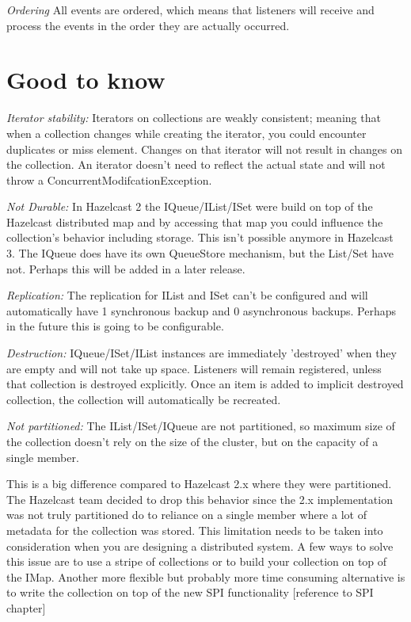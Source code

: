 \emph{Ordering} All events are ordered, which means that listeners will receive and process the events in the order they are actually occurred. 

\section{Good to know}

\emph{Iterator stability:} Iterators on collections are weakly consistent; meaning that when a collection changes while creating the iterator, you could encounter duplicates or miss element. Changes on that iterator will not result in changes on the collection. An iterator doesn't need to reflect the actual state and will not throw a ConcurrentModifcationException. 

\emph{Not Durable:} In Hazelcast 2 the IQueue/IList/ISet were build on top of the Hazelcast distributed map and by accessing that map you could influence the collection's behavior including storage. This isn't possible anymore in Hazelcast 3. The IQueue does have its own QueueStore mechanism, but the List/Set have not. Perhaps this will be added in a later release.

\emph{Replication:} The replication for IList and ISet can't be configured and will automatically have 1 synchronous backup and 0 asynchronous backups. Perhaps in the future this is going to be configurable.

\emph{Destruction:} IQueue/ISet/IList instances are immediately 'destroyed' when they are empty and will not take up space. Listeners will remain registered, unless that collection is destroyed explicitly. Once an item is added to implicit destroyed collection, the collection will automatically be recreated.

\emph{Not partitioned:}  The IList/ISet/IQueue are not partitioned, so maximum size of the collection doesn't rely on the size of the cluster, but on the capacity of a single member.

 This is a big difference compared to Hazelcast 2.x where they were partitioned. The Hazelcast team decided to drop this behavior since the 2.x implementation was not truly partitioned do to reliance on a single member where a lot of metadata for the collection was stored. This limitation needs to be taken into consideration when you are designing a distributed system. A few ways to solve this issue are to use a stripe of collections or to build your collection on top of the IMap. Another more flexible but probably more time consuming alternative is to write the collection on top of the new SPI functionality [reference to SPI chapter]

